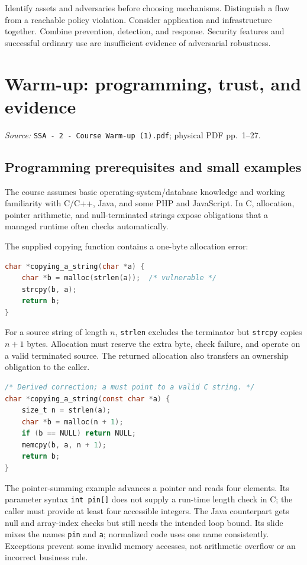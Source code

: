 \documentclass[11pt,a4paper]{article}
\newcommand{\currentmodule}{Contents}
\newcommand{\source}[2]{\textcolor{muted}{\small\textit{Source:} \nolinkurl{#1}; physical PDF pp.~#2.}\par\medskip}
\newcommand{\module}[2]{\par\Needspace{8\baselineskip}\gdef\currentmodule{#1}\section{#1}\label{#2}}
\numberwithin{figure}{section}
\begin{document}
\begin{takeaway}
Identify assets and adversaries before choosing mechanisms. Distinguish a flaw from a reachable policy violation. Consider application and infrastructure together. Combine prevention, detection, and response. Security features and successful ordinary use are insufficient evidence of adversarial robustness.
\end{takeaway}

\module{Warm-up: programming, trust, and evidence}{sec:warmup}
\source{SSA - 2 - Course Warm-up (1).pdf}{1--27}
\subsection{Programming prerequisites and small examples}
The course assumes basic operating-system/database knowledge and working familiarity with C/C++, Java, and some PHP and JavaScript. In C, allocation, pointer arithmetic, and null-terminated strings expose obligations that a managed runtime often checks automatically.

The supplied copying function contains a one-byte allocation error:
\begin{lstlisting}[language=C]
char *copying_a_string(char *a) {
    char *b = malloc(strlen(a));  /* vulnerable */
    strcpy(b, a);
    return b;
}
\end{lstlisting}
For a source string of length $n$, \texttt{strlen} excludes the terminator but \texttt{strcpy} copies $n+1$ bytes. Allocation must reserve the extra byte, check failure, and operate on a valid terminated source. The returned allocation also transfers an ownership obligation to the caller.
\begin{lstlisting}[language=C]
/* Derived correction; a must point to a valid C string. */
char *copying_a_string(const char *a) {
    size_t n = strlen(a);
    char *b = malloc(n + 1);
    if (b == NULL) return NULL;
    memcpy(b, a, n + 1);
    return b;
}
\end{lstlisting}

The pointer-summing example advances a pointer and reads four elements. Its parameter syntax \texttt{int pin[]} does not supply a run-time length check in C; the caller must provide at least four accessible integers. The Java counterpart gets null and array-index checks but still needs the intended loop bound. Its slide mixes the names \texttt{pin} and \texttt{a}; normalized code uses one name consistently. Exceptions prevent some invalid memory accesses, not arithmetic overflow or an incorrect business rule.
\end{document}
